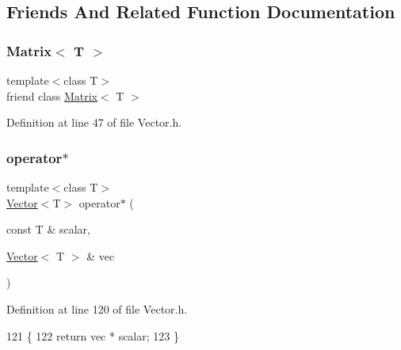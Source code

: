 \subsection{Friends And Related Function Documentation}
\mbox{\label{classLuna_1_1Vector_a17fc06682c9f9c46f1e0e38b7af25b80}} 
\subsubsection{\texorpdfstring{Matrix$<$ T $>$}{Matrix< T >}}
{\footnotesize\ttfamily template$<$class T$>$ \\
friend class \hyperlink{classLuna_1_1Matrix}{Matrix}$<$ T $>$\hspace{0.3cm}{\ttfamily [friend]}}



Definition at line 47 of file Vector.\+h.

\mbox{\label{classLuna_1_1Vector_a29f70258ec21b100141b45b009416f66}} 
\subsubsection{\texorpdfstring{operator$\ast$}{operator*}}
{\footnotesize\ttfamily template$<$class T$>$ \\
\hyperlink{classLuna_1_1Vector}{Vector}$<$T$>$ operator$\ast$ (\begin{DoxyParamCaption}\item[{const T \&}]{scalar,  }\item[{\hyperlink{classLuna_1_1Vector}{Vector}$<$ T $>$ \&}]{vec }\end{DoxyParamCaption})\hspace{0.3cm}{\ttfamily [friend]}}



Definition at line 120 of file Vector.\+h.


\begin{DoxyCode}
121     \{
122       \textcolor{keywordflow}{return} vec * scalar;
123     \}
\end{DoxyCode}
\mbox{\label{classLuna_1_1Vector_aa45a6e2bb9fbdb53db42d652a26eaac7}} 
